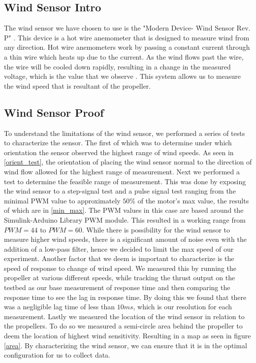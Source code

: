 \documentclass[conference]{IEEEtran}
\begin{document}
	\subsection{Wind Sensor Intro}
	The wind sensor we have chosen to use is the "Modern Device- Wind Sensor Rev. P" \cite{md}. This device is a hot wire anemometer that is designed to measure wind from any direction. Hot wire anemometers work by passing a constant current through a thin wire which heats up due to the current. As the wind flows past the wire, the wire will be cooled down rapidly, resulting in a change in the measured voltage, which is the value that we observe \cite{hot_wire}. This system allows us to measure the wind speed that is resultant of the propeller. 
	\subsection{Wind Sensor Proof}
	To understand the limitations of the wind sensor, we performed a series of tests to characterize the sensor. The first of which was to determine under which orientation the sensor observed the highest range of wind speeds. As seen in \ref{orient_test}, the orientation of placing the wind sensor normal to the direction of wind flow allowed for the highest range of measurement. Next we performed a test to determine the feasible range of measurement. This was done by exposing the wind sensor to a step-signal test and a pulse signal test ranging from the minimal PWM value to approximately $50\%$ of the motor's max value, the results of which are in \ref{min_max}. The PWM values in this case are based around the Simulink-Arduino Library PWM module.  This resulted in a working range from $PWM = 44$ to $PWM = 60$. While there is possibility for the wind sensor to measure higher wind speeds, there is a significant amount of noise even with the addition of a low-pass filter, hence we decided to limit the max speed of our experiment. 
	Another factor that we deem is important to characterize is the speed of response to change of wind speed. We measured this by running the propeller at various different speeds, while tracking the thrust output on the testbed as our base measurement of response time and then comparing the response time to see the lag in response time. By doing this we found that there was a negligible lag time of less than $10 ms$, which is our resolution for each measurement.
	Lastly we measured the location of the wind sensor in relation to the propellers. To do so we measured a semi-circle area behind the propeller to deem the location of highest wind sensitivity. Resulting in a map as seen in figure \ref{area}. 
	By characterizing the wind sensor, we can ensure that it is in the optimal configuration for us to collect data.
\end{document}
